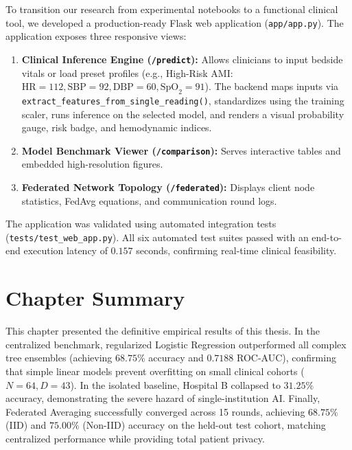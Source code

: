 To transition our research from experimental notebooks to a functional clinical tool, we developed a production-ready Flask web application (\texttt{app/app.py}). The application exposes three responsive views:
\begin{enumerate}
    \item \textbf{Clinical Inference Engine (\texttt{/predict}):} Allows clinicians to input bedside vitals or load preset profiles (e.g., High-Risk AMI: $\text{HR}=112, \text{SBP}=92, \text{DBP}=60, \text{SpO}_2=91$). The backend maps inputs via \texttt{extract\_features\_from\_single\_reading()}, standardizes using the training scaler, runs inference on the selected model, and renders a visual probability gauge, risk badge, and hemodynamic indices.
    \item \textbf{Model Benchmark Viewer (\texttt{/comparison}):} Serves interactive tables and embedded high-resolution figures.
    \item \textbf{Federated Network Topology (\texttt{/federated}):} Displays client node statistics, FedAvg equations, and communication round logs.
\end{enumerate}

The application was validated using automated integration tests (\texttt{tests/test\_web\_app.py}). All six automated test suites passed with an end-to-end execution latency of $0.157$ seconds, confirming real-time clinical feasibility.

\section{Chapter Summary}
\label{sec:chapter5_summary}

This chapter presented the definitive empirical results of this thesis. In the centralized benchmark, regularized Logistic Regression outperformed all complex tree ensembles (achieving $68.75\%$ accuracy and $0.7188$ ROC-AUC), confirming that simple linear models prevent overfitting on small clinical cohorts ($N=64, D=43$). In the isolated baseline, Hospital B collapsed to $31.25\%$ accuracy, demonstrating the severe hazard of single-institution AI. Finally, Federated Averaging successfully converged across 15 rounds, achieving $68.75\%$ (IID) and $75.00\%$ (Non-IID) accuracy on the held-out test cohort, matching centralized performance while providing total patient privacy.
